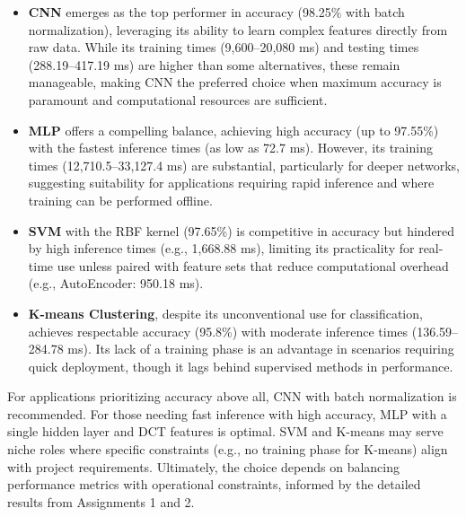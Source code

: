 \documentclass[a4paper,12pt]{article}
\begin{document}
\begin{itemize}
    \item \textbf{CNN} emerges as the top performer in accuracy (98.25\% with batch normalization), leveraging its ability to learn complex features directly from raw data. While its training times (9,600–20,080 ms) and testing times (288.19–417.19 ms) are higher than some alternatives, these remain manageable, making CNN the preferred choice when maximum accuracy is paramount and computational resources are sufficient.
    
    \item \textbf{MLP} offers a compelling balance, achieving high accuracy (up to 97.55\%) with the fastest inference times (as low as 72.7 ms). However, its training times (12,710.5–33,127.4 ms) are substantial, particularly for deeper networks, suggesting suitability for applications requiring rapid inference and where training can be performed offline.
    
    \item \textbf{SVM} with the RBF kernel (97.65\%) is competitive in accuracy but hindered by high inference times (e.g., 1,668.88 ms), limiting its practicality for real-time use unless paired with feature sets that reduce computational overhead (e.g., AutoEncoder: 950.18 ms).
    
    \item \textbf{K-means Clustering}, despite its unconventional use for classification, achieves respectable accuracy (95.8\%) with moderate inference times (136.59–284.78 ms). Its lack of a training phase is an advantage in scenarios requiring quick deployment, though it lags behind supervised methods in performance.\\
\end{itemize}
For applications prioritizing accuracy above all, CNN with batch normalization is recommended. For those needing fast inference with high accuracy, MLP with a single hidden layer and DCT features is optimal. SVM and K-means may serve niche roles where specific constraints (e.g., no training phase for K-means) align with project requirements. Ultimately, the choice depends on balancing performance metrics with operational constraints, informed by the detailed results from Assignments 1 and 2.
\end{document}
